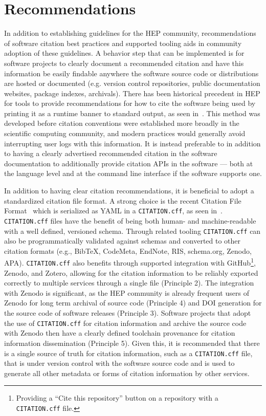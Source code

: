 \section{Recommendations}\label{sec:recommendations}

In addition to establishing guidelines for the HEP community, recommendations of software citation best practices and supported tooling aids in community adoption of these guidelines.
A behavior step that can be implemented is for software projects to clearly document a recommended citation and have this information be easily findable anywhere the software source code or distributions are hosted or documented (e.g. version control repositories, public documentation websites, package indexes, archivals).
There has been historical precedent in HEP for tools to provide recommendations for how to cite the software being used by printing it as a runtime banner to standard output, as seen in~.
This method was developed before citation conventions were established more broadly in the scientific computing community, and modern practices would generally avoid interrupting user logs with this information.
It is instead preferable to in addition to having a clearly advertised recommended citation in the software documentation to additionally provide citation APIs in the software --- both at the language level and at the command line interface if the software supports one.

In addition to having clear citation recommendations, it is beneficial to adopt a standardized citation file format.
A strong choice is the recent Citation File Format~\cite{Druskat_Citation_File_Format_2021} which is serialized as YAML in a \texttt{CITATION.cff}, as seen in~.
\texttt{CITATION.cff} files have the benefit of being both human- and machine-readable with a well defined, versioned schema.
Through related tooling \texttt{CITATION.cff} can also be programmatically validated against schemas and converted to other citation formats (e.g., BibTeX, CodeMeta, EndNote, RIS, schema.org, Zenodo, APA).
\texttt{CITATION.cff} also benefits through supported integration with GitHub\footnote{Providing a ``Cite this repository'' button on a repository with a \texttt{CITATION.cff} file.}, Zenodo, and Zotero, allowing for the citation information to be reliably exported correctly to multiple services through a single file (Principle 2).
The integration with Zenodo is significant, as the HEP community is already frequent users of Zenodo for long term archival of source code (Principle 4) and DOI generation for the source code of software releases (Principle 3).
Software projects that adopt the use of \texttt{CITATION.cff} for citation information and archive the source code with Zenodo then have a clearly defined toolchain provenance for citation information dissemination (Principle 5).
Given this, it is recommended that there is a single source of truth for citation information, such as a \texttt{CITATION.cff} file, that is under version control with the software source code and is used to generate all other metadata or forms of citation information by other services.

